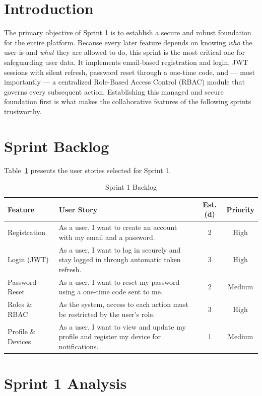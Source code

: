 \documentclass[12pt,a4paper,oneside]{report}
\begin{document}
\section{Introduction}
The primary objective of Sprint 1 is to establish a secure and robust foundation
for the entire platform. Because every later feature depends on knowing \emph{who}
the user is and \emph{what} they are allowed to do, this sprint is the most
critical one for safeguarding user data. It implements email-based registration
and login, JWT sessions with silent refresh, password reset through a one-time
code, and --- most importantly --- a centralized Role-Based Access Control (RBAC)
module that governs every subsequent action. Establishing this managed and secure
foundation first is what makes the collaborative features of the following sprints
trustworthy.

\section{Sprint Backlog}
Table~\ref{tab:s1-backlog} presents the user stories selected for Sprint 1.
\begin{table}[H]\centering
\caption{Sprint 1 Backlog}
\label{tab:s1-backlog}
\renewcommand{\arraystretch}{1.3}
\begin{tabularx}{\textwidth}{|p{3.2cm}|X|c|c|}
\hline
\textbf{Feature} & \textbf{User Story} & \textbf{Est. (d)} & \textbf{Priority} \\ \hline
Registration & As a user, I want to create an account with my email and a password. & 2 & High \\ \hline
Login (JWT) & As a user, I want to log in securely and stay logged in through automatic token refresh. & 3 & High \\ \hline
Password Reset & As a user, I want to reset my password using a one-time code sent to me. & 2 & Medium \\ \hline
Roles \& RBAC & As the system, access to each action must be restricted by the user's role. & 3 & High \\ \hline
Profile \& Devices & As a user, I want to view and update my profile and register my device for notifications. & 1 & Medium \\ \hline
\end{tabularx}
\renewcommand{\arraystretch}{1}
\end{table}

\section{Sprint 1 Analysis}
\end{document}
